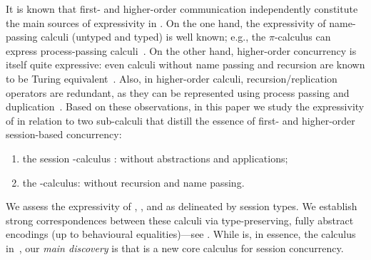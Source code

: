 It is known
that first- and higher-order com\-mu\-ni\-cation %
independently constitute 
the main sources 
of expressivity in \HOp. %
On the one hand, the expressivity of name-passing calculi (untyped and typed) is well known; e.g., the $\pi$-calculus can express 
process-passing calculi~\cite{SangiorgiD:expmpa}. 
On the other hand, higher-order concurrency is itself quite expressive: 
even  calculi without name passing and recursion are known to be Turing equivalent~\cite{DBLP:journals/iandc/LanesePSS11}.
Also, in higher-order calculi,
recursion/replication operators are redundant, as they can be represented using process passing and duplication~\cite{ThomsenB:plachoasgcfhop}. 
Based on these observations, 
in this paper we study the expressivity of \HOp in relation to two  sub-calculi
that distill the essence of first- and higher-order session-based concurrency:
\begin{enumerate}[-]
\item the session \sessp-calculus : \HOp without abstractions and applications;
\item the \HO-calculus: \HOp without recursion and name passing.
\end{enumerate}
We assess the expressivity 
 of \HOp, \HO, and \sessp as delineated by session types. 
We establish strong correspondences between 
these calculi via 
type-preserving, fully abstract encodings (up to 
behavioural equalities)---see . 
While \sessp is, 
in essence, the calculus in~\cite{honda.vasconcelos.kubo:language-primitives}, 
our \emph{main discovery} is 
that \HO  is a new core calculus 
for %
session concurrency.





